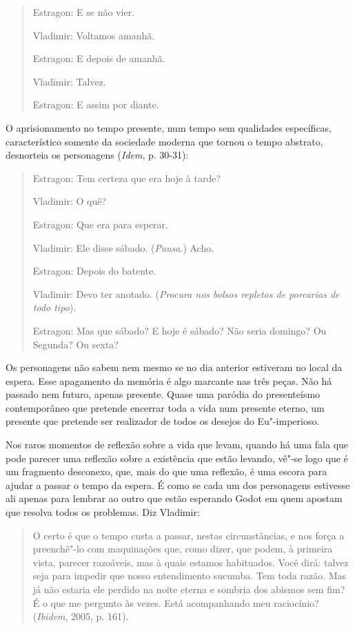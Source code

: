 \begin{quote}
\forceindent{}Estragon: E se não vier.

Vladimir: Voltamos amanhã.

Estragon: E depois de amanhã.

Vladimir: Talvez.

Estragon: E assim por diante.
\end{quote}

O aprisionamento no tempo presente, num tempo sem qualidades
específicas, característico somente da sociedade moderna que tornou o
tempo abstrato, desnorteia os personagens (\emph{Idem}, p. 30-31):

\begin{quote}
\forceindent{}Estragon: Tem certeza que era hoje à tarde?

Vladimir: O quê?

Estragon: Que era para esperar.

Vladimir: Ele disse sábado. (\emph{Pausa}.) Acho.

Estragon: Depois do batente.

Vladimir: Devo ter anotado. (\emph{Procura nos bolsos repletos de
porcarias de todo tipo}).

Estragon: Mas que sábado? E hoje é sábado? Não seria domingo? Ou
Segunda? Ou sexta?
\end{quote}

Os personagens não sabem nem mesmo se no dia anterior estiveram no local
da espera. Esse apagamento da memória é algo marcante nas três peças.
Não há passado nem futuro, apenas presente. Quase uma paródia do
presenteísmo contemporâneo que pretende encerrar toda a vida num
presente eterno, um presente que pretende ser realizador de todos os
desejos do Eu"-imperioso.

Nos raros momentos de reflexão sobre a vida que levam, quando há uma
fala que pode parecer uma reflexão sobre a existência que estão levando,
vê"-se logo que é um fragmento desconexo, que, mais do que uma reflexão,
é uma escora para ajudar a passar o tempo da espera. É como se cada um
dos personagens estivesse ali apenas para lembrar ao outro que estão
esperando Godot em quem apostam que resolva todos os problemas. Diz
Vladimir:

\begin{quote}
O certo é que o tempo custa a passar, nestas circunstâncias, e nos força
a preenchê"-lo com maquinações que, como dizer, que podem, à primeira
vista, parecer razoáveis, mas à quais estamos habituados. Você dirá:
talvez seja para impedir que nosso entendimento sucumba. Tem toda razão.
Mas já não estaria ele perdido na noite eterna e sombria dos abismos sem
fim? É o que me pergunto às vezes. Está acompanhando meu raciocínio?
(\emph{Ibidem}, 2005, p. 161).
\end{quote}

